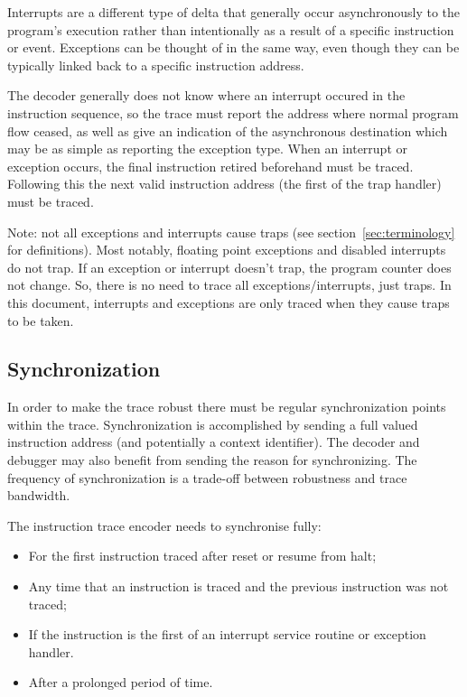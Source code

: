 Interrupts are a different type of delta that generally occur
asynchronously to the program's execution rather than intentionally as
a result of a specific instruction or event. Exceptions can be thought
of in the same way, even though they can be typically linked back to a
specific instruction address.

The decoder generally does not know
where an interrupt occured in the instruction sequence, so the trace
must report the address where normal program flow ceased, as well as
give an indication of the asynchronous destination which may be as
simple as reporting the exception type.  When an interrupt or
exception occurs, the final instruction retired beforehand must be traced.  
Following this the next valid instruction address (the first of the
trap handler) must be traced.

Note: not all exceptions and interrupts cause traps (see 
section~\ref{sec:terminology} for definitions). Most notably, 
floating point exceptions and disabled interrupts do not trap.
If an exception or interrupt doesn't trap, the program counter does not
change. So, there is no need to trace all exceptions/interrupts, just
traps.  In this document, interrupts and exceptions are only traced when 
they cause traps to be taken.

\subsection{Synchronization} \label{synchronization}

In order to make the trace robust there must be regular
synchronization points within the trace. Synchronization is accomplished by
sending a full valued instruction address (and potentially a context
identifier). The decoder and debugger may also benefit from sending
the reason for synchronizing. The frequency of synchronization is a
trade-off between robustness and trace bandwidth.

The instruction trace encoder needs to synchronise fully:

\begin{itemize}

\item For the first instruction traced after reset or resume from halt;
\item Any time that an instruction is traced and the previous instruction was not traced;
\item If the instruction is the first of an interrupt service routine or
exception handler.
\item After a prolonged period of time.
\end{itemize}

